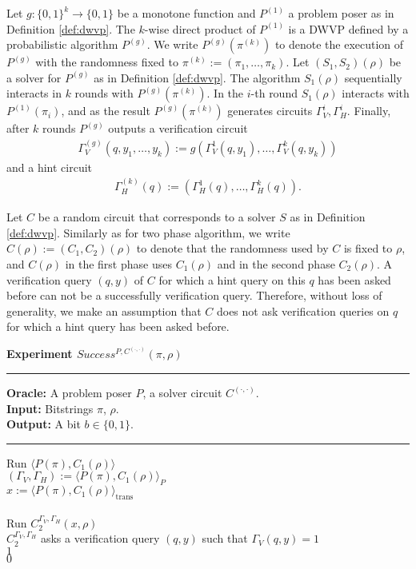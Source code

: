 \begin{definition}
  Let $g: \{0,1\}^{k} \rightarrow \{0,1\}$ be a monotone function and $P^{(1)}$ a problem poser as in Definition \ref{def:dwvp}.
  The $k$-wise direct product of $P^{(1)}$ is a DWVP defined by a probabilistic algorithm $P^{(g)}$.
  We write $P^{(g)}(\pi^{(k)})$ to denote the execution of $P^{(g)}$ with the randomness fixed to $\pi^{(k)} := (\pi_1, \dots, \pi_k)$.
  Let $(S_1, S_2)(\rho)$ be a solver for $P^{(g)}$ as in Definition \ref{def:dwvp}.
  The algorithm $S_1(\rho)$ sequentially interacts in $k$ rounds with $P^{(g)}(\pi^{(k)})$.
  In the $i$-th round $S_1(\rho)$ interacts with $P^{(1)}(\pi_i)$,
  and as the result $P^{(g)}(\pi^{(k)})$ generates circuits $\Gamma_V^i, \Gamma_H^i$.
  Finally, after $k$ rounds $P^{(g)}$ outputs a verification circuit
\begin{align*}
  \Gamma_V^{(g)} (q, y_1, \dots, y_k) := g(\Gamma_V^{1}(q, y_1), \dots, \Gamma_V^{k}(q, y_k))
\end{align*}
and a hint circuit
\begin{align*}
  \Gamma_H^{(k)} (q) := (\Gamma_H^{1}(q), \dots, \Gamma_H^{k}(q)).
\end{align*}
\end{definition}
%
Let $C$ be a random circuit that corresponds to a solver $S$ as in Definition \ref{def:dwvp}.
Similarly as for two phase algorithm, we write $C(\rho) := (C_1, C_2)(\rho)$ to denote that the randomness used by $C$
is fixed to $\rho$, and $C(\rho)$ in the first phase uses $C_1(\rho)$ and in the second phase $C_2(\rho)$.
%
A verification query $(q,y)$ of $C$ for which a hint query on this $q$ has been asked before can not be a successfully verification query.
Therefore, without loss of generality, we make an assumption that $C$ does not ask verification queries on $q$
for which a hint query has been asked before.
%
\begin{codeblock}
  \textbf{Experiment $Success^{P, C^{(\cdot, \cdot)}}(\pi, \rho) $}
  \medskip
  \hrule
  \medskip
  \textbf{Oracle:} A problem poser $P$, a solver circuit $C^{(\cdot,\cdot)}$.\\
  \textbf{Input:}  Bitstrings $\pi$, $\rho$.\\
  \textbf{Output:} A bit $b \in \{0,1\}$.
  \medskip\hrule\medskip
  Run $\langle P(\pi), C_1(\rho) \rangle$ \\
  \IndI $(\Gamma_V, \Gamma_H) := \langle P(\pi), C_1(\rho) \rangle_{P}$ \\
  \IndI $x := \langle P(\pi), C_1(\rho) \rangle_{\text{trans}}$ \\ \\
  Run $C_2^{\Gamma_V,\Gamma_H}(x, \rho)$ \\
  \IndI \If $C_2^{\Gamma_V, \Gamma_H}$ asks a verification query $(q, y)$ such that $\Gamma_V(q, y) = 1$ \then \\
  \IndII \return $1$ \\
  \return $0$ \\
\end{codeblock}
